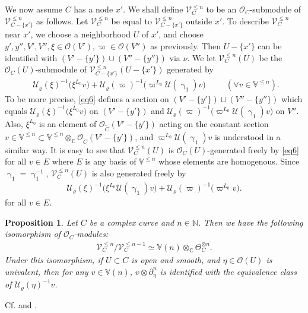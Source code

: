 \documentclass[11pt,b5paper,notitlepage]{article}
\theoremstyle{definition}
\theoremstyle{plain}
\newtheorem{pp}[df]{Proposition}
\newcommand{\mc}{\mathcal}
\newcommand{\wtd}{\widetilde}
\newcommand{\scr}{\mathscr}
\newcommand{\Vbb}{\mathbb V}
\newcommand{\Cbb}{\mathbb C}
\newcommand{\Nbb}{\mathbb N}
\numberwithin{equation}{section}
\begin{document}
We now assume $C$ has a node $x'$. We shall define $\scr V_C^{\leq n}$ to be an $\scr O_C$-submodule of $\scr V^{\leq n}_{C-\{x'\}}$ as follows. Let $\scr V_C^{\leq n}$ be equal to $\scr V^{\leq n}_{C-\{x'\}}$ outside $x'$. To describe $\scr V_C^{\leq n}$ near $x'$, we choose a neighborhood $U$ of $x'$, and choose $y',y'',V',V'',\xi\in\scr O(V'),\varpi\in\scr O(V'')$ as previously. Then $U-\{x'\}$ can be identified with $(V'-\{y'\})\cup (V''-\{y''\})$ via $\nu$. We let $\scr V_C^{\leq n}(U)$ be the $\scr O_C(U)$-submodule of $\scr V_{C-\{x'\}}^{\leq n}(U-\{x'\})$ generated by
\begin{align}
\boxed{~~\mc U_\varrho(\xi)^{-1}\big(\xi^{L_0}v\big)+\mc U_\varrho(\varpi)^{-1}\big(\varpi^{L_0}\mc U(\upgamma_1)v\big)~~}\qquad (\forall v\in\Vbb^{\leq n}).\label{eq6}
\end{align}
To be more precise, \eqref{eq6} defines a section on $(V'-\{y'\})\sqcup (V''-\{y''\})$ which equals $\mc U_\varrho(\xi)^{-1}\big(\xi^{L_0}v\big)$ on $(V'-\{y'\})$ and $\mc U_\varrho(\varpi)^{-1}\big(\varpi^{L_0}\mc U(\upgamma_1)v\big)$ on $V''$. Also, $\xi^{L_0}$ is an element of $\scr O_{\wtd C}(V'-\{y'\})$ acting on the constant section $v\in\Vbb^{\leq n}\subset\Vbb^{\leq n}\otimes_{\Cbb}\scr O_{\wtd C}(V'-\{y'\})$, and $\varpi^{L_0}\mc U(\upgamma_1)v$ is understood in a similar way.  It is easy to see that $\scr V_C^{\leq n}(U)$ is $\scr O_C(U)$-generated freely by \eqref{eq6} for all $v\in E$ where $E$ is any basis of $\Vbb^{\leq n}$ whose elements are homogenous. Since $\upgamma_1=\upgamma_1^{-1}$, $\scr V_C^{\leq n}(U)$ is also generated freely by
\begin{align}
\mc U_\varrho(\xi)^{-1}\big(\xi^{L_0}\mc U(\upgamma_1)v\big)+\mc U_\varrho(\varpi)^{-1}\big(\varpi^{L_0}v\big).
\end{align}
for all $v\in E$.

\begin{pp}\label{lb3}
Let $C$ be a complex curve and $n\in\Nbb$. Then we have the following isomorphism of  $\scr O_C$-modules:
\begin{align}
\scr V_C^{\leq n}/\scr V_C^{\leq n-1}\simeq\Vbb(n)\otimes_{\Cbb}\Theta_C^{\otimes n}.\label{eq7}
\end{align}
Under this isomorphism, if $U\subset C$ is open and smooth, and $\eta\in\scr O(U)$ is univalent, then for any $v\in\Vbb(n)$, $v\otimes \partial_\eta^n$ is identified with the equivalence class of $\mc U_\varrho(\eta)^{-1}v$.
\end{pp}

Cf. \cite[Sec.6.5.9]{FB04} and \cite{DGT19b}.
\end{document}
